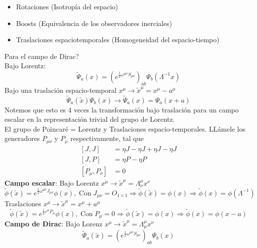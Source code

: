 \documentclass[../main.tex]{subfiles}
\begin{document}
\begin{itemize}
  \item Rotaciones (Isotropía del espacio)
  \item Boosts (Equivalencia de los observadores inerciales)
  \item Traslaciones espaciotemporales (Homogeneidad del espacio-tiempo)
\end{itemize}
Para el campo de Dirac? \\
Bajo Lorentz: 
\begin{equation*}
  \tilde{\Psi}_a(x) = \left( e^{\frac{1}{2}\omega^{\mu \nu}S_{\mu \nu}} \right)_{ab} \Psi_b(\Lambda^{-1}x) 
\end{equation*}
Bajo una traslación espacio-temporal $x^\mu\rightarrow \tilde{x}^\mu = x^\mu - a^\mu$
\begin{equation*}
  \tilde{\Psi}_a(\tilde{x}) \Psi_b(x) \rightarrow \tilde{\Psi}_a(x) = \Psi_a(x+a)
\end{equation*}
Notemos que esto es 4 veces la transformación bajo traslación para un campo escalar en la representación trivial del grupo de Lorentz.  \\
El grupo de Poincaré = Lorentz y Traslaciones espacio-temporales. LLámele los generadores $P_{\mu \nu}$ y $P_\mu$ respectivamente, tal que
 \begin{align*}
   \left[ J , J \right] & = \eta J - \eta J + \eta J - \eta J \\
   \left[ J , P \right] & = \eta P - \eta P \\
   \left[ P_\mu , P_\nu \right] & = 0
 \end{align*} 
 \textbf{Campo escalar}: Bajo Lorentz $x^\mu \rightarrow \tilde{x}^\mu = \Lambda^\mu_\nu x^\nu$
 \begin{equation*}
   \tilde{\phi}(\tilde{x}) = e^{\frac{1}{2}\omega^{\mu \nu}J_{\mu \nu}}\phi(x) ,\; \text{Con}\; J_{\mu \nu} = O_{1\times 1} \Rightarrow \tilde{\phi}(\tilde{x}) = \phi(x) \Rightarrow \tilde{\phi}(x) = \phi(\Lambda^{-1})
 \end{equation*}
 Traslaciones $x^\mu \rightarrow \tilde{x}^\mu = x^\mu + a^\mu$
 \begin{equation*}
   \tilde{\phi}(\tilde{x}) = e^{\frac{1}{2}\varepsilon^\mu P_\mu} \phi(x), \; \text{Con}\; P_\mu = 0 \Rightarrow \tilde{\phi}(\tilde{x}) = \phi(x) \Rightarrow \tilde{\phi}(x) = \phi(x-a)
 \end{equation*}
 \textbf{Campo de Dirac}: Bajo Lorenz $x^\mu \rightarrow \tilde{x}^\mu = \Lambda^\mu_\mu x^\nu$
 \begin{equation*}
   \tilde{\Psi}_a(\tilde{x}) = \left( e^{\frac{1}{2}\omega^{\mu \nu}S_{\mu \nu}} \right)_{ab} \Psi_b(x)
 \end{equation*}
\end{document}
